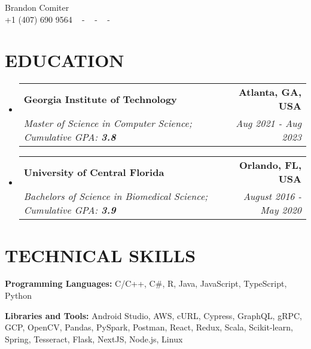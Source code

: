 \documentclass[letterpaper,11pt]{article}
\makeatletter
\newcommand{\resumeSubheading}[4]{
  \vspace{-2pt}\item
    \begin{tabular*}{1.0\textwidth}[t]{l@{\extracolsep{\fill}}r}
      \textbf{\large#1} & \textbf{\small #2} \\
      \textit{\large#3} & \textit{\small #4} \\
      
    \end{tabular*}\vspace{-7pt}
}
\newcommand{\resumeSubHeadingListStart}{\begin{itemize}[leftmargin=0.0in, label={}]}
\newcommand{\resumeSubHeadingListEnd}{\end{itemize}}
\makeatother
\begin{document}


\begin{center}

    {\huge Brandon Comiter} \\ \vspace{2pt} 
    {+1 (407) 690 9564} ~ 
    \small{-}
    \href{mailto:bcomiter@gmail.com}{\color{blue}{ bcomiter@gmail.com}} ~ 
    \small{-}
    \href{www.linkedin.com/in/brandon-comiter/}{\color{blue}{ linkedin.com/in/brandon-comiter}}  ~
    \small{-}
    \href{https://github.com/b-comiter}{\color{blue}{ github.com/b-comiter}} ~
    \vspace{-7pt}
\end{center}

\section{\color{catalinablue}EDUCATION}
  \resumeSubHeadingListStart
    \resumeSubheading
      {Georgia Institute of Technology}{Atlanta, GA, USA}
      {Master of Science in Computer Science; Cumulative GPA: \textbf{3.8}}{Aug 2021 - Aug 2023}
    \vspace{0pt}
    
    \resumeSubheading
      {University of Central Florida}{Orlando, FL, USA}
      {Bachelors of Science in Biomedical Science; Cumulative GPA: \textbf{3.9}}{August 2016 - May 2020}
      
  \resumeSubHeadingListEnd
  \vspace{-20pt}

\section{\color{catalinablue}TECHNICAL SKILLS}
 \begin{itemize}[leftmargin=0in, label={}]
    \small{\item{
     \textbf{\normalsize{Programming Languages:}}{ \normalsize{C/C++, C\#, R, Java, JavaScript, TypeScript, Python}} \\
      \vspace{1.2pt}
      
     \textbf{\normalsize{Libraries and Tools:}}{ \normalsize{Android Studio, AWS, cURL, Cypress, GraphQL, gRPC, GCP, OpenCV, Pandas, PySpark, Postman, React, Redux, Scala, Scikit-learn, Spring, Tesseract, Flask, NextJS, Node.js, Linux}} \\
      \vspace{1.2pt}
      
     }}
 \end{itemize}
 \vspace{-16pt}
 
\end{document}
